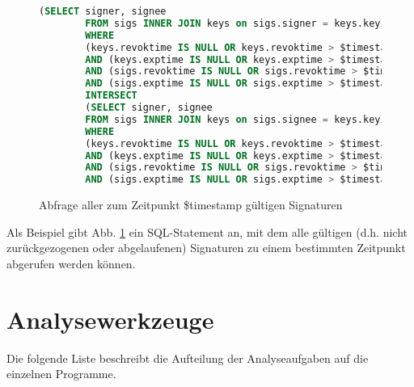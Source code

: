 \begin{appendix}
  \begin{figure}[h]
    \centering
    {\scriptsize
      \begin{lstlisting}[language=SQL]
        (SELECT signer, signee
        FROM sigs INNER JOIN keys on sigs.signer = keys.keyid 
        WHERE 
        (keys.revoktime IS NULL OR keys.revoktime > $timestamp) 
        AND (keys.exptime IS NULL OR keys.exptime > $timestamp)
        AND (sigs.revoktime IS NULL OR sigs.revoktime > $timestamp) 
        AND (sigs.exptime IS NULL OR sigs.exptime > $timestamp)) 
        INTERSECT 
        (SELECT signer, signee 
        FROM sigs INNER JOIN keys on sigs.signee = keys.keyid
        WHERE 
        (keys.revoktime IS NULL OR keys.revoktime > $timestamp) 
        AND (keys.exptime IS NULL OR keys.exptime > $timestamp) 
        AND (sigs.revoktime IS NULL OR sigs.revoktime > $timestamp) 
        AND (sigs.exptime IS NULL OR sigs.exptime > $timestamp))
      \end{lstlisting}
    }
    \caption{Abfrage aller zum Zeitpunkt \$timestamp gültigen Signaturen}
    \label{fig:all-valid-keys}
  \end{figure}

  Als Beispiel gibt Abb. \ref{fig:all-valid-keys} ein SQL-Statement an,
  mit dem alle gültigen (d.h. nicht zurückgezogenen oder abgelaufenen)
  Signaturen zu einem bestimmten Zeitpunkt abgerufen werden können.

\chapter{Analysewerkzeuge}
\label{cha:analysewerkzeuge}

Die folgende Liste beschreibt die Aufteilung der Analyseaufgaben auf
die einzelnen Programme.


\end{appendix}
